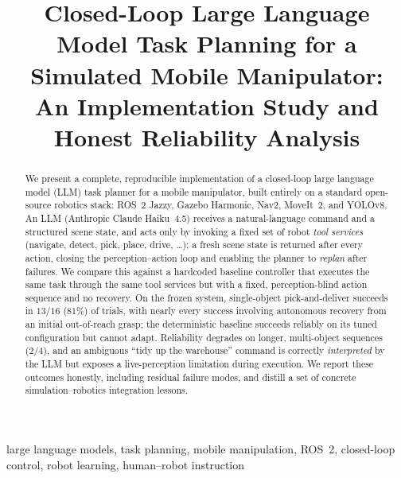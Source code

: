 \documentclass[conference]{IEEEtran}
\begin{document}
\title{Closed-Loop Large Language Model Task Planning for a Simulated Mobile Manipulator:\\
An Implementation Study and Honest Reliability Analysis}

\author{
}

\maketitle

\begin{abstract}
We present a complete, reproducible implementation of a closed-loop large
language model (LLM) task planner for a mobile manipulator, built entirely on a
standard open-source robotics stack: ROS~2 Jazzy, Gazebo Harmonic, Nav2, MoveIt~2,
and YOLOv8. An LLM (Anthropic Claude Haiku~4.5) receives a natural-language
command and a structured scene state, and acts only by invoking a fixed set of
robot \emph{tool services} (navigate, detect, pick, place, drive, \dots); a fresh
scene state is returned after every action, closing the perception--action loop
and enabling the planner to \emph{replan} after failures. We compare this against
a hardcoded baseline controller that executes the same task through the same tool
services but with a fixed, perception-blind action sequence and no recovery. On
the frozen system, single-object pick-and-deliver succeeds in $13/16$ ($81\%$)
of trials, with nearly every success involving autonomous recovery from an initial
out-of-reach grasp; the deterministic baseline succeeds reliably on its tuned
configuration but cannot adapt. Reliability degrades on longer, multi-object
sequences ($2/4$), and an ambiguous ``tidy up the warehouse'' command is
correctly \emph{interpreted} by the LLM but exposes a live-perception limitation
during execution. We report these outcomes honestly, including residual failure
modes, and distill a set of concrete simulation--robotics integration lessons.
\end{abstract}

\begin{IEEEkeywords}
large language models, task planning, mobile manipulation, ROS~2, closed-loop
control, robot learning, human--robot instruction
\end{IEEEkeywords}

\end{document}
